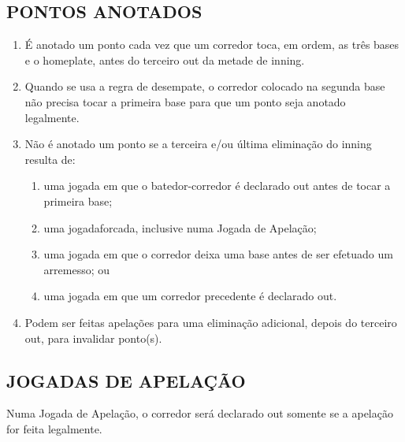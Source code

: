 \subsection{PONTOS ANOTADOS}
\begin{enumerate}[label=(\alph*)]
	\item É anotado um ponto cada vez que um corredor toca, em ordem, as três bases e o \gls{homeplate}, antes do terceiro \gls{out} da metade de \gls{inning}.
\item  Quando se usa a regra de desempate, o corredor colocado na segunda base não precisa tocar a primeira base para que um ponto seja anotado legalmente.
\item  Não é anotado um ponto se a terceira e/ou última eliminação do \gls{inning} resulta de:
	 \begin{enumerate}[label=\roman*.]
	\item uma jogada em que o batedor-corredor é declarado \gls{out} antes de tocar a  primeira base;
	\item  uma \gls{jogadaforcada}, inclusive numa Jogada de Apelação;
	\item  uma jogada em que o corredor deixa uma base antes de ser efetuado um arremesso; ou
	\item  uma jogada em que um corredor precedente é declarado \gls{out}.
	\end{enumerate}
\item  Podem ser feitas apelações para uma eliminação adicional, depois do terceiro \gls{out}, para invalidar ponto(s).

\end{enumerate}
\subsection{JOGADAS DE APELAÇÃO}

Numa Jogada de Apelação, o corredor será declarado \gls{out} somente se a  apelação for feita legalmente.

